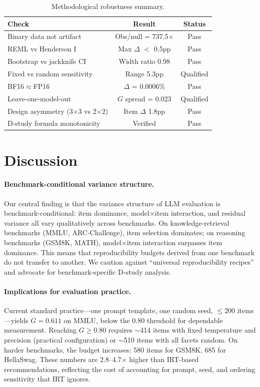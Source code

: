 \documentclass[11pt,letterpaper]{article}
\begin{document}
\begin{table}[t]
\centering
\caption{Methodological robustness summary.}
\label{tab:robustness}
\small
\begin{tabular}{lcc}
\toprule
\textbf{Check} & \textbf{Result} & \textbf{Status} \\
\midrule
Binary data not artifact & Obs/null = 737.5$\times$ & Pass \\
REML vs Henderson I & Max $\Delta$ $<$ 0.5pp & Pass \\
Bootstrap vs jackknife CI & Width ratio 0.98 & Pass \\
Fixed vs random sensitivity & Range 5.3pp & Qualified \\
BF16$\approx$FP16 & $\Delta$ = 0.0006\% & Pass \\
Leave-one-model-out & $G$ spread = 0.023 & Qualified \\
Design asymmetry (3$\times$3 vs 2$\times$2) & Item $\Delta$ 1.8pp & Pass \\
D-study formula monotonicity & Verified & Pass \\
\bottomrule
\end{tabular}
\end{table}

\section{Discussion}

\paragraph{Benchmark-conditional variance structure.}
Our central finding is that the variance structure of LLM evaluation is benchmark-conditional: item dominance, model$\times$item interaction, and residual variance all vary qualitatively across benchmarks. On knowledge-retrieval benchmarks (MMLU, ARC-Challenge), item selection dominates; on reasoning benchmarks (GSM8K, MATH), model$\times$item interaction surpasses item dominance. This means that reproducibility budgets derived from one benchmark do not transfer to another. We caution against ``universal reproducibility recipes'' and advocate for benchmark-specific D-study analysis.

\paragraph{Implications for evaluation practice.}
Current standard practice---one prompt template, one random seed, $\leq$200 items---yields $G = 0.611$ on MMLU, below the 0.80 threshold for dependable measurement. Reaching $G \geq 0.80$ requires $\sim$414 items with fixed temperature and precision (practical configuration) or $\sim$510 items with all facets random. On harder benchmarks, the budget increases: 580 items for GSM8K, 685 for HellaSwag. These numbers are 2.8--4.7$\times$ higher than IRT-based recommendations, reflecting the cost of accounting for prompt, seed, and ordering sensitivity that IRT ignores.
\end{document}
